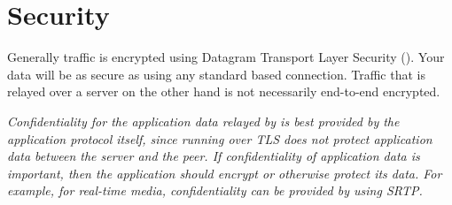 \section{Security}
Generally  traffic is encrypted using Datagram Transport Layer Security (). Your data will be as secure as using any standard  based connection. Traffic that is relayed over a  server on the other hand is not necessarily end-to-end encrypted.

\textit{Confidentiality for the application data relayed by  is best provided by the application protocol itself, since running  over TLS does not protect application data between the server and the peer. If confidentiality of application data is important, then the application should encrypt or otherwise protect its data. For example, for real-time media, confidentiality can be provided by using SRTP.}~\cite{TURN:sec}